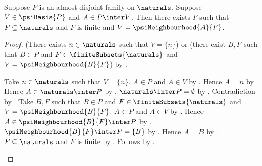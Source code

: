 \begin{proposition}\label{psi_family_point_in_basis_member}
    Suppose $P$ is an almost-disjoint family on $\naturals$.
    Suppose $V\in\psiBasis{P}$ and $A\in P\inter V$.
    Then there exists $F$ such that
        $F\subseteq\naturals$ and $F$ is finite and
        $V=\psiNeighbourhood{A}{F}$.
\end{proposition}
\begin{proof}
    (There exists $n\in\naturals$ such that $V=\{n\}$) or
        (there exist $B,F$ such that $B\in P$ and
            $F\in\finiteSubsets{\naturals}$ and
            $V=\psiNeighbourhood{B}{F}$)
        by .
    \begin{byCase}
            Take $n\in\naturals$ such that $V=\{n\}$.
            $A\in P$ and $A\in V$ by .
            Hence $A=n$ by .
            Hence $A\in\naturals\inter P$ by .
            $\naturals\inter P=\emptyset$
                by .
            Contradiction by .
            Take $B,F$ such that $B\in P$ and
                $F\in\finiteSubsets{\naturals}$ and
                $V=\psiNeighbourhood{B}{F}$.
            $A\in P$ and $A\in V$ by .
            Hence $A\in\psiNeighbourhood{B}{F}\inter P$
                by .
            $\psiNeighbourhood{B}{F}\inter P=\{B\}$
                by .
            Hence $A=B$ by .
            $F\subseteq\naturals$ and $F$ is finite
                by .
            Follows by \auto.
    \end{byCase}
\end{proof}

